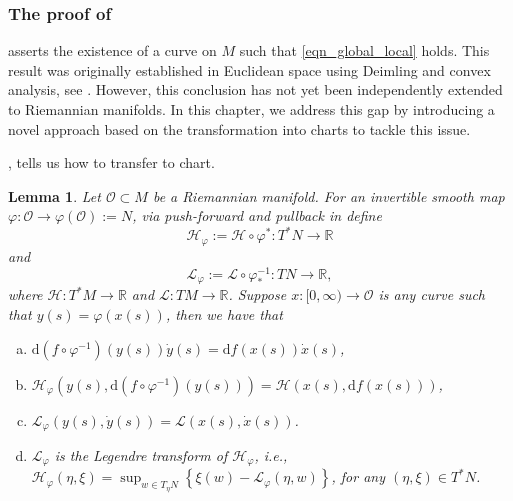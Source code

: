 \documentclass[a4paper]{article}
\numberwithin{equation}{section}
\newtheorem{lemma}[theorem]{Lemma}
\theoremstyle{definition}
\begin{document}
\subsubsection{The proof of } 
 asserts the existence of a curve on $M$ such that \eqref{eqn_global_local} holds. This result was originally established in Euclidean space using Deimling and convex analysis, see \cite{H1993,BD1997}. However, this conclusion has not yet been independently extended to Riemannian manifolds. In this chapter, we address this gap by introducing a novel approach based on the transformation into charts to tackle this issue.
\par
 , tells us how to transfer to chart. 
 \begin{lemma}\label{lem_lemma1}
	Let $\mathcal{O}\subset M$ be a Riemannian manifold. For an invertible smooth map $\varphi: \mathcal{O}\to \varphi(\mathcal{O}):=N$, via push-forward and pullback  in  define 
	\begin{equation*} \mathcal{H}_{\varphi}:=\mathcal{H}\circ \varphi^*:T^*N \to \mathbb{R}
	\end{equation*}
	and 
	\begin{equation*}
		\mathcal{L}_\varphi:=\mathcal{L}\circ \varphi^{-1}_*:TN\to \mathbb{R},
	\end{equation*} 
	where $\mathcal{H}:T^*M\to \mathbb{R}$ and $\mathcal{L}:TM\to \mathbb{R}$. Suppose $x : [0,\infty) \rightarrow \mathcal{O}$ is any curve such that $y(s)=\varphi(x(s))$, 
	then we have that
	\begin{enumerate}[(a)]
		\item \label{item_HL2}  
		$\mathrm{d}(f\circ\varphi^{-1})(y(s))\dot{y}(s)=\mathrm{d}f(x(s))\dot{x}(s)$,
		\item \label{item_HL3} $
		\mathcal{H}_{\varphi}(y(s),\mathrm{d} (f \circ \varphi^{-1})(y(s)))=\mathcal{H}(x(s),\mathrm{d}f(x(s)))
		$,
		\item \label{item_HL4} 
		$
		\mathcal{L}_{\varphi}(y(s),\dot{y}(s))=\mathcal{L}(x(s),\dot{x}(s))$.
		\item \label{item_HL1} $\mathcal{L}_\varphi $ is the Legendre transform of $\mathcal{H}_\varphi$, i.e.,
		$\mathcal{H}_\varphi(\eta,\xi)=\sup_{w\in T_{\eta}N}\left\{\xi(w)-\mathcal{L}_\varphi(\eta,w)\right\}$, for any $(\eta,\xi)\in T^*N$.
	\end{enumerate}
\end{lemma}
\end{document}
